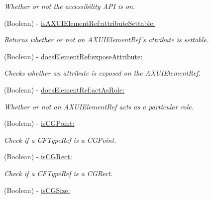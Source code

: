 \begin{DoxyCompactItemize}
\begin{DoxyCompactList}\small\item\em Whether or not the accessibility API is on. \item\end{DoxyCompactList}\item 
(Boolean) -\/ \hyperlink{interface_g_d_accessibility_manager_ac28b17f1ec344fc9edb3de8c0a05b40f}{isAXUIElementRef:attributeSettable:}
\begin{DoxyCompactList}\small\item\em Returns whether or not an AXUIElementRef's attribute is settable. \item\end{DoxyCompactList}\item 
(Boolean) -\/ \hyperlink{interface_g_d_accessibility_manager_ad3fc09b2e6330989ea5bc28ba1ecdc9d}{doesElementRef:exposeAttribute:}
\begin{DoxyCompactList}\small\item\em Checks whether an attribute is exposed on the AXUIElementRef. \item\end{DoxyCompactList}\item 
(Boolean) -\/ \hyperlink{interface_g_d_accessibility_manager_ab01d89443568416b034e6a8750106ddb}{doesElementRef:actAsRole:}
\begin{DoxyCompactList}\small\item\em Whether or not an AXUIElementRef acts as a particular role. \item\end{DoxyCompactList}\item 
(Boolean) -\/ \hyperlink{interface_g_d_accessibility_manager_a76393da95b202ecff6dd43e663539b62}{isCGPoint:}
\begin{DoxyCompactList}\small\item\em Check if a CFTypeRef is a CGPoint. \item\end{DoxyCompactList}\item 
(Boolean) -\/ \hyperlink{interface_g_d_accessibility_manager_ad8efe9efcd0f371e78166652a64a726b}{isCGRect:}
\begin{DoxyCompactList}\small\item\em Check if a CFTypeRef is a CGRect. \item\end{DoxyCompactList}\item 
(Boolean) -\/ \hyperlink{interface_g_d_accessibility_manager_ae1536a4ac65421f4f50d44adbc992683}{isCGSize:}

\end{DoxyCompactItemize}
